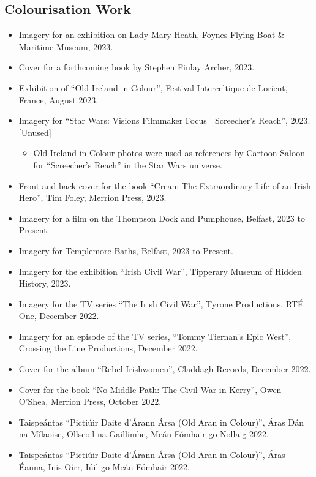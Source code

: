 \documentclass[10pt,a4paper]{res} %
\begin{document}
\begin{resume}
\subsection*{Colourisation Work}

\begin{itemize} \itemsep -2pt
\item Imagery for an exhibition on Lady Mary Heath, Foynes Flying Boat \& Maritime Museum, 2023.
\item Cover for a forthcoming book by Stephen Finlay Archer, 2023.
\item Exhibition of ``Old Ireland in Colour'', Festival Interceltique de Lorient, France, August 2023.
\item Imagery for ``Star Wars: Visions Filmmaker Focus | Screecher's Reach'', 2023. [Unused]
\begin{itemize} \itemsep -2pt
\item Old Ireland in Colour photos were used as references by Cartoon Saloon for ``Screecher's Reach'' in the Star Wars universe.
\end{itemize}
\item Front and back cover for the book ``Crean: The Extraordinary Life of an Irish Hero'', Tim Foley, Merrion Press, 2023.
\item Imagery for a film on the Thompson Dock and Pumphouse, Belfast, 2023 to Present.
\item Imagery for Templemore Baths, Belfast, 2023 to Present.
\item Imagery for the exhibition ``Irish Civil War'', Tipperary Museum of Hidden History, 2023.
\item Imagery for the TV series ``The Irish Civil War'', Tyrone Productions, RT\'{E} One, December 2022.
\item Imagery for an episode of the TV series, ``Tommy Tiernan's Epic West'', Crossing the Line Productions, December 2022.
\item Cover for the album ``Rebel Irishwomen'', Claddagh Records, December 2022.
\item Cover for the book ``No Middle Path: The Civil War in Kerry'', Owen O'Shea, Merrion Press, October 2022.
\item Taispe\'{a}ntas ``Picti\'{u}ir Daite d'\'{A}rann \'{A}rsa (Old Aran in Colour)'', \'{A}ras D\'{a}n na M\'{i}laoise, Ollscoil na Gaillimhe, Me\'{a}n F\'{o}mhair go Nollaig 2022.
\item Taispe\'{a}ntas ``Picti\'{u}ir Daite d'\'{A}rann \'{A}rsa (Old Aran in Colour)'', \'{A}ras \'{E}anna, Inis O\'{i}rr, I\'{uil} go Me\'{a}n F\'{o}mhair 2022.

\end{itemize}
\end{resume}
\end{document}
